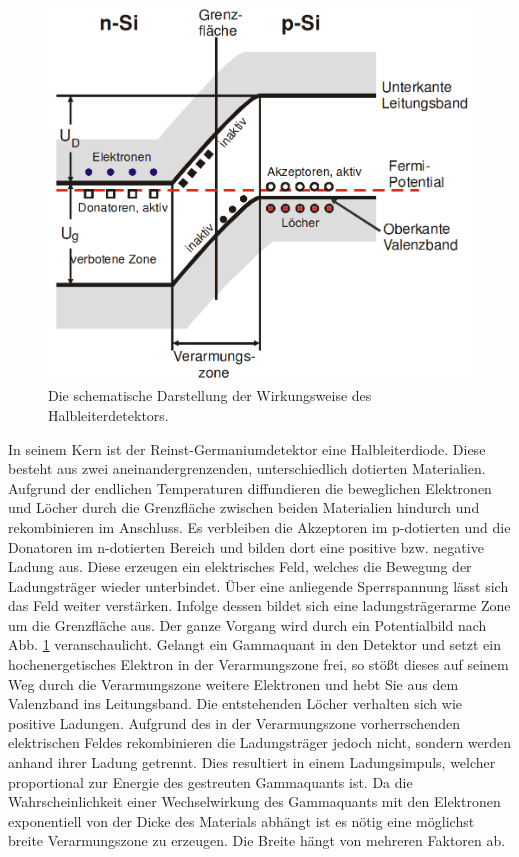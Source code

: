 \begin{figure}
	\centering
	\includegraphics[width=\linewidth-100pt,height=\textheight-100pt,keepaspectratio]{content/Images/detek.png}
    \caption{Die schematische Darstellung der Wirkungsweise des Halbleiterdetektors\cite{V18}.}
    \label{fig:POTENTIAL}
\end{figure}

In seinem Kern ist der Reinst-Germaniumdetektor eine Halbleiterdiode. Diese besteht aus zwei aneinandergrenzenden, unterschiedlich dotierten Materialien. Aufgrund der endlichen Temperaturen diffundieren die beweglichen Elektronen und Löcher durch die Grenzfläche zwischen beiden Materialien hindurch und rekombinieren im Anschluss. Es verbleiben die Akzeptoren im p-dotierten und die Donatoren im n-dotierten Bereich und bilden dort eine positive bzw. negative Ladung aus. Diese erzeugen ein elektrisches Feld, welches die Bewegung der Ladungsträger wieder unterbindet. Über eine anliegende Sperrspannung lässt sich das Feld weiter verstärken. Infolge dessen bildet sich eine ladungsträgerarme Zone um die Grenzfläche aus. Der ganze Vorgang wird durch ein Potentialbild nach Abb. \ref{fig:POTENTIAL} veranschaulicht. Gelangt ein Gammaquant in den Detektor und setzt ein hochenergetisches Elektron in der Verarmungszone frei, so stößt dieses auf seinem Weg durch die Verarmungszone weitere Elektronen und hebt Sie aus dem Valenzband ins Leitungsband. Die entstehenden Löcher verhalten sich wie positive Ladungen. Aufgrund des in der Verarmungszone vorherrschenden elektrischen Feldes rekombinieren die Ladungsträger jedoch nicht, sondern werden anhand ihrer Ladung getrennt. Dies resultiert in einem Ladungsimpuls, welcher proportional zur Energie des gestreuten Gammaquants ist. %
Da die Wahrscheinlichkeit einer Wechselwirkung des Gammaquants mit den Elektronen exponentiell von der Dicke des Materials abhängt ist es nötig eine möglichst breite Verarmungszone zu erzeugen. Die Breite hängt von mehreren Faktoren ab.

